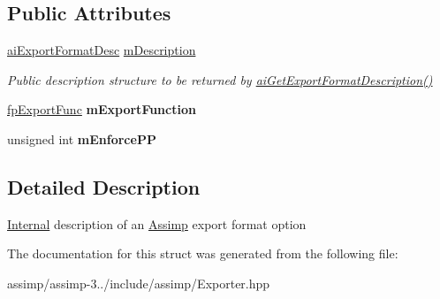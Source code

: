 \subsection*{Public Attributes}
\begin{DoxyCompactItemize}
\item 
\hypertarget{struct_assimp_1_1_exporter_1_1_export_format_entry_a59f8bf48e35a70ac0540c9b65d4b891d}{\hyperlink{structai_export_format_desc}{ai\+Export\+Format\+Desc} \hyperlink{struct_assimp_1_1_exporter_1_1_export_format_entry_a59f8bf48e35a70ac0540c9b65d4b891d}{m\+Description}}\label{struct_assimp_1_1_exporter_1_1_export_format_entry_a59f8bf48e35a70ac0540c9b65d4b891d}

\begin{DoxyCompactList}\small\item\em Public description structure to be returned by \hyperlink{_assimp_c_export_8cpp_a6896ce9b9851aec848ba11bfc4a525f4}{ai\+Get\+Export\+Format\+Description()} \end{DoxyCompactList}\item 
\hypertarget{struct_assimp_1_1_exporter_1_1_export_format_entry_a5cf4464ae6f7f7d92aaade27f1e545f5}{\hyperlink{class_assimp_1_1_exporter_aa67334a75cb24e030af984d01e622f3b}{fp\+Export\+Func} {\bfseries m\+Export\+Function}}\label{struct_assimp_1_1_exporter_1_1_export_format_entry_a5cf4464ae6f7f7d92aaade27f1e545f5}

\item 
\hypertarget{struct_assimp_1_1_exporter_1_1_export_format_entry_aefb2d077aebc473ce9a6e38fd883f181}{unsigned int {\bfseries m\+Enforce\+P\+P}}\label{struct_assimp_1_1_exporter_1_1_export_format_entry_aefb2d077aebc473ce9a6e38fd883f181}

\end{DoxyCompactItemize}


\subsection{Detailed Description}
\hyperlink{struct_internal}{Internal} description of an \hyperlink{class_assimp}{Assimp} export format option 

The documentation for this struct was generated from the following file\+:\begin{DoxyCompactItemize}
\item 
assimp/assimp-\/3../include/assimp/Exporter.\+hpp\end{DoxyCompactItemize}
